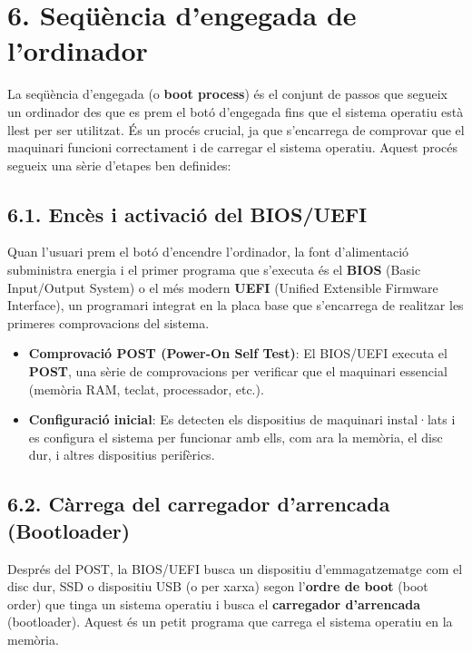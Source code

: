\documentclass[
  a4paper,
]{article}
\begin{document}
\section{6. Seqüència d'engegada de
l'ordinador}\label{sequxfcuxe8ncia-dengegada-de-lordinador}

La seqüència d'engegada (o \textbf{boot process}) és el conjunt de
passos que segueix un ordinador des que es prem el botó d'engegada fins
que el sistema operatiu està llest per ser utilitzat. És un procés
crucial, ja que s'encarrega de comprovar que el maquinari funcioni
correctament i de carregar el sistema operatiu. Aquest procés segueix
una sèrie d'etapes ben definides:

\subsection{\texorpdfstring{6.1. \textbf{Encès i activació del
BIOS/UEFI}}{6.1. Encès i activació del BIOS/UEFI}}\label{encuxe8s-i-activaciuxf3-del-biosuefi}

Quan l'usuari prem el botó d'encendre l'ordinador, la font d'alimentació
subministra energia i el primer programa que s'executa és el
\textbf{BIOS} (Basic Input/Output System) o el més modern \textbf{UEFI}
(Unified Extensible Firmware Interface), un programari integrat en la
placa base que s'encarrega de realitzar les primeres comprovacions del
sistema.

\begin{itemize}
\item
  \textbf{Comprovació POST (Power-On Self Test)}: El BIOS/UEFI executa
  el \textbf{POST}, una sèrie de comprovacions per verificar que el
  maquinari essencial (memòria RAM, teclat, processador, etc.).
\item
  \textbf{Configuració inicial}: Es detecten els dispositius de
  maquinari instal·lats i es configura el sistema per funcionar amb
  ells, com ara la memòria, el disc dur, i altres dispositius
  perifèrics.
\end{itemize}

\subsection{\texorpdfstring{6.2. \textbf{Càrrega del carregador
d'arrencada
(Bootloader)}}{6.2. Càrrega del carregador d'arrencada (Bootloader)}}\label{cuxe0rrega-del-carregador-darrencada-bootloader}

Després del POST, la BIOS/UEFI busca un dispositiu d'emmagatzematge com
el disc dur, SSD o dispositiu USB (o per xarxa) segon l'\textbf{ordre de
boot} (boot order) que tinga un sistema operatiu i busca el
\textbf{carregador d'arrencada} (bootloader). Aquest és un petit
programa que carrega el sistema operatiu en la memòria.
\end{document}
